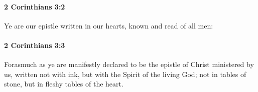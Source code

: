 		\paragraph{2 Corinthians 3:2} %
			\label{2CORINTHIANS-3-2}

			Ye are our epistle written in our hearts, known and read of all men:

			\begin{framed}
			\scriptsize
				\begin{compactdesc}
					\item[SBLG] 
				\end{compactdesc}
			\end{framed}

		\paragraph{2 Corinthians 3:3} %
			\label{2CORINTHIANS-3-3}

			Forasmuch as ye are manifestly declared to be the epistle of Christ ministered by us, written not with ink, but with the Spirit of the living God; not in tables of stone, but in fleshy tables of the heart.

